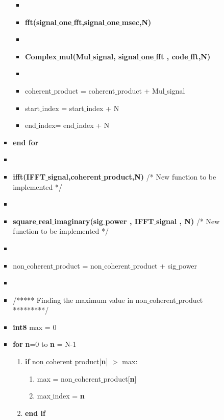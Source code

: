 \documentclass[journal,10pt,onecolumn]{article}
\begin{document}
\begin{itemize}
\begin{enumerate}
\begin{enumerate}
\begin{itemize}
\begin{itemize}
                \item[] 
                \item[] \textbf{fft(signal$\_$one$\_$fft,signal$\_$one$\_$msec,N)}
                \item[] 
                \item[] \textbf{Complex$\_$mul(Mul$\_$signal, signal$\_$one$\_$fft , code$\_$fft,N)}
                \item[] 
                \item[] coherent$\_$product = coherent$\_$product +  Mul$\_$signal
                \item[]   start$\_$index =  start$\_$index + N
                \item[]   end$\_$index= end$\_$index + N
            \end{itemize}
            \item[] \textbf{end for}
            \item[] 
            \item[] \textbf{ifft(IFFT$\_$signal,coherent$\_$product,N)} /* New function to be implemented */
            \item[] 
            \item[] \textbf{square$\_$real$\_$imaginary(sig$\_$power , IFFT$\_$signal , N)} /* New function to be implemented */
            \item[] 
            \item[] non$\_$coherent$\_$product = non$\_$coherent$\_$product +  sig$\_$power
            \item[] 
            \item[]  /***** Finding the maximum value in non$\_$coherent$\_$product *********/
            \item[] \textbf{int8} max = 0
            \item[] \textbf{for} \textbf{n}=0 to \textbf{n} = N-1
            \begin{enumerate}
                \item[] \textbf{if} non$\_$coherent$\_$product[\textbf{n}] $>$ max:
                \begin{enumerate}
                    \item[] max = non$\_$coherent$\_$product[\textbf{n}]
                    \item[] max$\_$index = \textbf{n}
                \end{enumerate}
               \item[] \textbf{end if}
            \end{enumerate}

\end{itemize}
\end{enumerate}
\end{enumerate}
\end{itemize}
\end{document}
